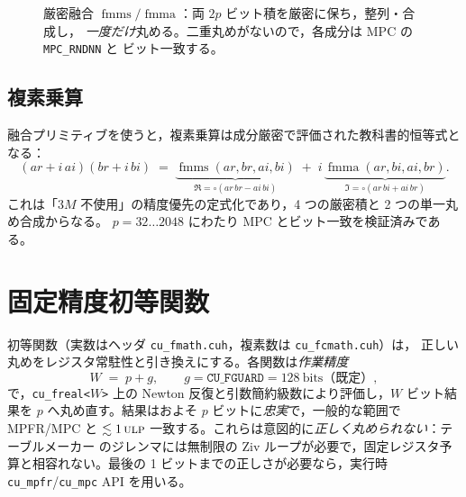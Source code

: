 \documentclass[uplatex,dvipdfmx,a4paper,11pt]{jsarticle}
\newcommand{\code}[1]{\texttt{#1}}
\newcommand{\PB}{\ensuremath{p}}
\newcommand{\round}{\ensuremath{\circ}}
\newcommand{\ulp}{\textsc{ulp}}
\newcommand{\rndn}{\textsc{rndn}}
\newcommand{\fmma}{\ensuremath{\operatorname{fmma}}}
\newcommand{\fmms}{\ensuremath{\operatorname{fmms}}}
\begin{document}
\begin{figure}[h]
\centering
{}
\caption{厳密融合 $\fmms/\fmma$：両 $2\PB$ ビット積を厳密に保ち，整列・合成し，
\emph{一度だけ}丸める。二重丸めがないので，各成分は MPC の \code{MPC\_RNDNN} と
ビット一致する。}
\label{fig:fmms}
\end{figure}

\subsection{複素乗算}
融合プリミティブを使うと，複素乗算は成分厳密で評価された教科書的恒等式となる：
\begin{equation}
(ar+i\,ai)(br+i\,bi) \;=\; \underbrace{\fmms(ar,br,ai,bi)}_{\Re=\round(ar\,br-ai\,bi)}
\;+\; i\,\underbrace{\fmma(ar,bi,ai,br)}_{\Im=\round(ar\,bi+ai\,br)} .
\end{equation}
これは「$3M$ 不使用」の精度優先の定式化であり，4 つの厳密積と 2 つの単一丸め合成からなる。
$\PB=32\ldots2048$ にわたり MPC とビット一致を検証済みである。


\section{固定精度初等関数}
\label{sec:elem}

初等関数（実数はヘッダ \code{cu\_fmath.cuh}，複素数は \code{cu\_fcmath.cuh}）は，
正しい丸めをレジスタ常駐性と引き換えにする。各関数は\emph{作業精度}
\begin{equation}
W \;=\; \PB + g, \qquad g = \texttt{CU\_FGUARD} = 128~\text{bits（既定）},
\end{equation}
で，\code{cu\_freal<$W$>} 上の Newton 反復と引数簡約級数により評価し，$W$ ビット結果を
\PB{} へ丸め直す。結果はおよそ \PB{} ビットに\emph{忠実}で，一般的な範囲で MPFR/MPC と
$\lesssim 1\,\ulp$ 一致する。これらは意図的に\emph{正しく丸められない}：テーブルメーカー
のジレンマには無制限の Ziv ループが必要で，固定レジスタ予算と相容れない。最後の 1
ビットまでの正しさが必要なら，実行時 \code{cu\_mpfr}/\code{cu\_mpc} API を用いる。
\end{document}
